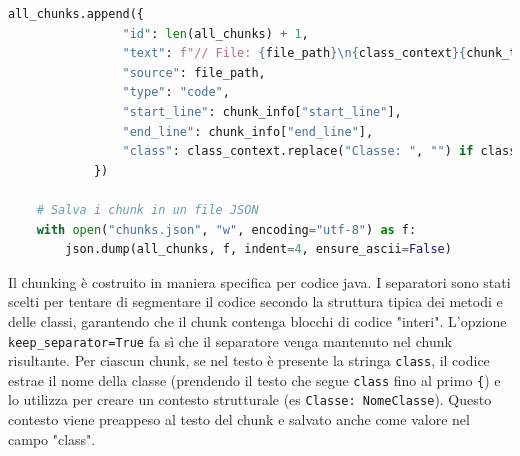 \documentclass[12pt,a4paper,openright,twoside]{book}
\begin{document}
\begin{lstlisting}[language=Python, caption={Codice Python per la suddivisione dei file Java in chunk}, label={lst:chunking}]
            all_chunks.append({
                "id": len(all_chunks) + 1,
                "text": f"// File: {file_path}\n{class_context}{chunk_text}",
                "source": file_path,
                "type": "code",
                "start_line": chunk_info["start_line"],
                "end_line": chunk_info["end_line"],
                "class": class_context.replace("Classe: ", "") if class_context else ""
            })
    
    # Salva i chunk in un file JSON
    with open("chunks.json", "w", encoding="utf-8") as f:
        json.dump(all_chunks, f, indent=4, ensure_ascii=False)
    \end{lstlisting}


    Il chunking è costruito in maniera specifica per codice java.
    I separatori sono stati scelti per tentare di segmentare il codice secondo la struttura tipica dei metodi e delle classi, garantendo che il chunk contenga blocchi di codice "interi".
    L'opzione \texttt{keep\_separator=True} fa sì che il separatore venga mantenuto nel chunk risultante.
    Per ciascun chunk, se nel testo è presente la stringa \texttt{class}, il codice estrae il nome della classe 
    (prendendo il testo che segue \texttt{class} fino al primo \texttt{\{}) e lo utilizza per creare un contesto 
    strutturale (es \texttt{Classe: NomeClasse}).
    Questo contesto viene preappeso al testo del chunk e salvato anche come valore nel campo "class".
\end{document}
